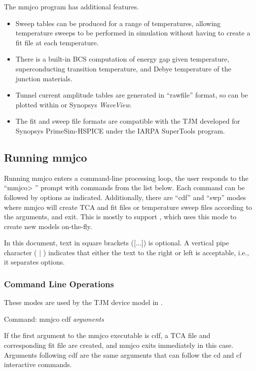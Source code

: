{The {\vt mmjco} program has additional features.
\begin{itemize}
\item{Sweep tables can be produced for a range of temperatures,
allowing temperature sweeps to be performed in simulation without
having to create a fit file at each temperature.}
\item{There is a built-in BCS computation of energy gap given
temperature, superconducting transition temperature, and Debye
temperature of the junction materials.}
\item{Tunnel current amplitude tables are generated in ``rawfile''
format, so can be plotted within {\WRspice} or Synopsys
{\it WaveView}.}
\item{The fit and sweep file formats are compatible with the TJM
developed for Synopsys PrimeSim-HSPICE under the IARPA SuperTools
program.}
\end{itemize}

\subsection{Running {\vt mmjco}}

Running {\vt mmjco} enters a command-line processing loop, the user
responds to the ``{\vt mmjco> }'' prompt with commands from the list
below.  Each command can be followed by options as indicated. 
Additionally, there are ``{\vt cdf}'' and ``{\vt swp}'' modes where
{\vt mmjco} will create TCA and fit files or temperature sweep files
according to the arguments, and exit.  This is mostly to support
{\WRspice}, which uses this mode to create new models on-the-fly.

In this document, text in square brackets ([...]) is optional.  A
vertical pipe character ( $|$ ) indicates that either the text to the
right or left is acceptable, i.e., it separates options.

\subsubsection{Command Line Operations}

These modes are used by the TJM device model in {\WRspice}.

Command:  {\vt mmjco cdf} {\it arguments}

If the first argument to the {\vt mmjco} executable is {\vt cdf}, a
TCA file and corresponding fit file are created, and {\vt mmjco} exits
immediately in this case.  Arguments following {\vt cdf} are the same
arguments that can follow the {\vt cd} and {\vt cf} interactive
commands.

}

